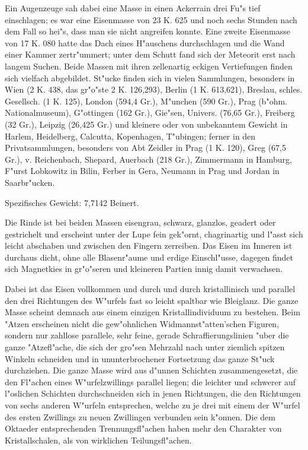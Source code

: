\documentclass[a4paper, 11pt, oneside]{article}
\begin{document}
Ein Augenzeuge sah dabei eine Masse in einen Ackerrain drei Fu"s tief einschlagen; es war eine Eisenmasse von 23 K. 625 und noch sechs Stunden nach dem Fall so hei"s, dass man sie nicht angreifen konnte. Eine zweite Eisenmasse von 17 K. 080 hatte das Dach eines H"auschens durchschlagen und die Wand einer Kammer zertr"ummert; unter dem Schutt fand sich der Meteorit erst nach langem Suchen. Beide Massen mit ihren zellenartig eckigen Vertiefungen finden sich vielfach abgebildet. St"ucke finden sich in vielen Sammlungen, besonders in Wien (2 K. 438, das gr"o"ste 2 K. 126,293), Berlin (1 K. 613,621), Breslau, schles. Gesellsch. (1 K. 125), London (594,4 Gr.), M"unchen (590 Gr.), Prag (b"ohm. Nationalmuseum), G"ottingen (162 Gr.), Gie"sen, Univers. (76,65 Gr.), Freiberg (32 Gr.), Leipzig (26,425 Gr.) und kleinere oder von unbekanntem Gewicht in Harlem, Heidelberg, Calcutta, Kopenhagen, T"ubingen; ferner in den Privatsammlungen, besonders von Abt Zeidler in Prag (1 K. 120), Greg (67,5 Gr.), v. Reichenbach, Shepard, Auerbach (218 Gr.), Zimmermann in Hamburg, F"urst Lobkowitz in Bilin, Ferber in Gera, Neumann in Prag und Jordan in Saarbr"ucken.

Spezifisches Gewicht: 7,7142 Beinert.

Die Rinde ist bei beiden Massen eisengrau, schwarz, glanzlos, geadert oder gestrichelt und erscheint unter der Lupe fein gek"ornt, chagrinartig und l"asst sich leicht abschaben und zwischen den Fingern zerreiben. Das Eisen im Inneren ist durchaus dicht, ohne alle Blasenr"aume und erdige Einschl"usse, dagegen findet sich Magnetkies in gr"o"seren und kleineren Partien innig damit verwachsen.

Dabei ist das Eisen vollkommen und durch und durch kristallinisch und parallel den drei Richtungen des W"urfels fast so leicht spaltbar wie Bleiglanz. Die ganze Masse scheint demnach aus einem einzigen Kristallindividuum zu bestehen. Beim "Atzen erscheinen nicht die gew"ohnlichen Widmannst"atten'schen Figuren, sondern nur zahllose parallele, sehr feine, gerade Schraffierungslinien "uber die ganze "Atzefl"ache, die sich der gro"sen Mehrzahl nach unter ziemlich spitzen Winkeln schneiden und in ununterbrochener Fortsetzung das ganze St"uck durchziehen. Die ganze Masse wird aus d"unnen Schichten zusammengesetzt, die den Fl"achen eines W"urfelzwillings parallel liegen; die leichter und schwerer auf l"oslichen Schichten durchschneiden sich in jenen Richtungen, die den Richtungen von sechs anderen W"urfeln entsprechen, welche zu je drei mit einem der W"urfel des ersten Zwillings zu neuen Zwillingen verbunden sein k"onnen. Die dem Oktaeder entsprechenden Trennungsfl"achen haben mehr den Charakter von Kristallschalen, als von wirklichen Teilungsfl"achen.
\end{document}
